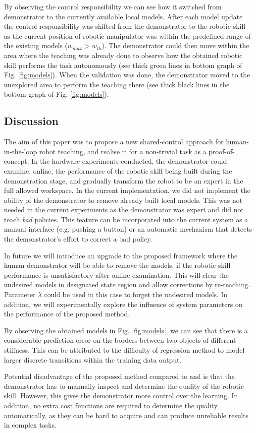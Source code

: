 By observing the control responsibility we can see how it switched from demonstrator to the currently available local models. After each model update the control responsibility was shifted from the demonstrator to the robotic skill as the current position of robotic manipulator was within the predefined range of the existing models ($w_{max}>w_{th}$). The demonstrator could then move within the area where the teaching was already done to observe how the obtained robotic skill performs the task autonomously (see thick green lines in bottom graph of Fig. \ref{fig:models}). When the validation was done, the demonstrator moved to the unexplored area to perform the teaching there (see thick black lines in the bottom graph of Fig. \ref{fig:models}).


\subsection{Discussion}
The aim of this paper was to propose a new shared-control approach for human-in-the-loop robot teaching, and realise it for a non-trivial task as a proof-of-concept. In the hardware experiments conducted, the demonstrator could examine, online, the performance of the robotic skill being built during the demonstration stage, and gradually transform the robot to be an expert in the full allowed workspace. In the current implementation, we did not implement the ability of the demonstrator to remove already built local models. This was not needed in the current experiments as the demonstrator was expert and did not teach {\it bad} policies. This feature can be incorporated into the current system as a manual interface (e.g. pushing a button) or an automatic mechanism that detects the demonstrator's effort to correct a bad policy.

In future we will introduce an upgrade to the proposed framework where the human demonstrator will be able to remove the models, if the robotic skill performance is unsatisfactory after online examination. This will clear the undesired models in designated state region and allow corrections by re-teaching. Parameter $\lambda$ could be used in this case to forget the undesired models. In addition, we will experimentally explore the influence of system parameters on the performance of the proposed method.

By observing the obtained models in Fig. \ref{fig:models}, we can see that there is a considerable prediction error on the borders between two objects of different stiffness. This can be attributed to the difficulty of regression method to model larger discrete transitions within the training data output.

Potential disadvantage of the proposed method compared to \cite{Peternel2013b} and \cite{Zamani2015} is that the demonstrator has to manually inspect and determine the quality of the robotic skill. However, this gives the demonstrator more control over the learning. In addition, no extra cost functions are required to determine the quality automatically, as they can be hard to acquire and can produce unreliable results in complex tasks.